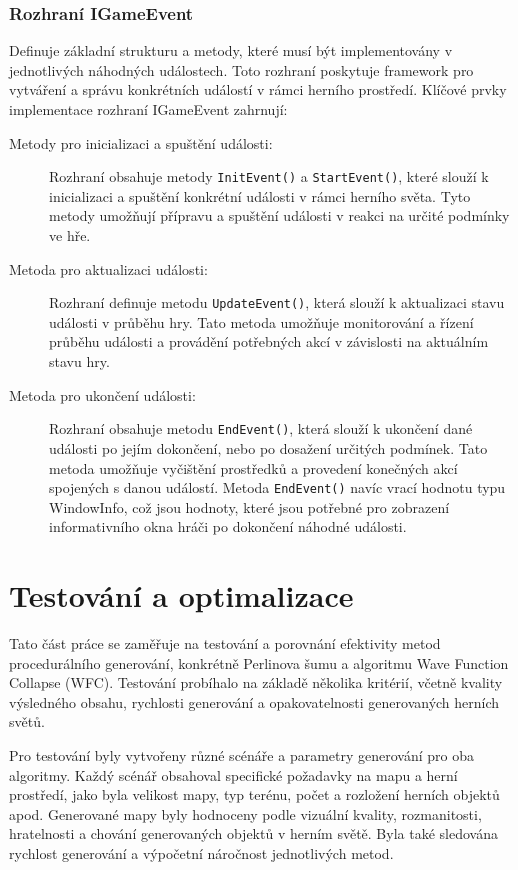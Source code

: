 \subsection{Rozhraní IGameEvent}
Definuje základní strukturu a metody, které musí být implementovány v jednotlivých náhodných událostech. Toto rozhraní poskytuje framework pro vytváření a správu konkrétních událostí v rámci herního prostředí. Klíčové prvky implementace rozhraní IGameEvent zahrnují:
\begin{description}
	\item[Metody pro inicializaci a spuštění události:] Rozhraní obsahuje metody \texttt{InitEvent()} a \texttt{StartEvent()}, které slouží k inicializaci a spuštění konkrétní události v rámci herního světa. Tyto metody umožňují přípravu a spuštění události v reakci na určité podmínky ve hře.
	\item[Metoda pro aktualizaci události:] Rozhraní definuje metodu \texttt{UpdateEvent()}, která slouží k aktualizaci stavu události v průběhu hry. Tato metoda umožňuje monitorování a řízení průběhu události a provádění potřebných akcí v závislosti na aktuálním stavu hry.
	\item[Metoda pro ukončení události:] Rozhraní obsahuje metodu \texttt{EndEvent()}, která slouží k ukončení dané události po jejím dokončení, nebo po dosažení určitých podmínek. Tato metoda umožňuje vyčištění prostředků a provedení konečných akcí spojených s danou událostí. Metoda \texttt{EndEvent()} navíc vrací hodnotu typu WindowInfo, což jsou hodnoty, které jsou potřebné pro zobrazení informativního okna hráči po dokončení náhodné události.
\end{description}

\chapter{Testování a optimalizace}
\label{experiments}
Tato část práce se zaměřuje na testování a porovnání efektivity metod procedurálního generování, konkrétně Perlinova šumu a algoritmu Wave Function Collapse (WFC). Testování probíhalo na základě několika kritérií, včetně kvality výsledného obsahu, rychlosti generování a opakovatelnosti generovaných herních světů.

Pro testování byly vytvořeny různé scénáře a parametry generování pro oba algoritmy. Každý scénář obsahoval specifické požadavky na mapu a herní prostředí, jako byla velikost mapy, typ terénu, počet a rozložení herních objektů apod. Generované mapy byly hodnoceny podle vizuální kvality, rozmanitosti, hratelnosti a chování generovaných objektů v herním světě. Byla také sledována rychlost generování a výpočetní náročnost jednotlivých metod.

